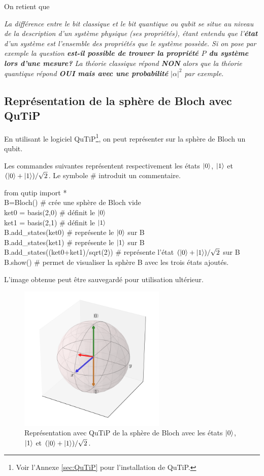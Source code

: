 On retient que

\medskip
\colorbox[gray]{0.8}{
\parbox[c]{0.9\textwidth}{
\emph{La différence entre le bit classique et le bit quantique ou qubit se situe
au niveau de la description d'un système physique (ses propriétés), étant
entendu que l'\textbf{état} d'un système est l'ensemble des propriétés que le
système possède. Si on pose par exemple la question \textbf{est-il possible de
trouver la propriété $P$ du système lors d'une mesure?} La théorie classique
répond \textbf{NON} alors que la théorie quantique répond \textbf{OUI mais avec
une probabilité} $|\alpha|^{2}$ par exemple.}
}}

\subsection{Représentation de la sphère de Bloch avec QuTiP}

En utilisant le logiciel QuTiP\footnote{Voir l'Annexe \ref{sec:QuTiP} pour 
l'installation de QuTiP.}, on peut représenter sur la sphère de Bloch un 
qubit.

Les commandes suivantes représentent respectivement les états $\vert0\rangle$, 
$\vert1\rangle$ et $(\vert0\rangle+\vert1\rangle)/\sqrt{2}$. Le symbole \# introduit un 
commentaire.

\begin{tt}
from qutip import *\\
B=Bloch() \# crée une sphère de Bloch vide\\
ket0 = basis(2,0) \# définit le $\vert0\rangle$\\
ket1 = basis(2,1) \# définit le $\vert1\rangle$\\
B.add\_states(ket0) \# représente le $\vert0\rangle$ sur B\\
B.add\_states(ket1) \# représente le $\vert1\rangle$ sur B\\
B.add\_states((ket0+ket1)/sqrt(2)) \# représente l'état 
$(\vert0\rangle+\vert1\rangle)/\sqrt{2}$ sur B\\
B.show() \# permet de visualiser la sphère B avec les trois états ajoutés.
\end{tt}
L'image obtenue peut être sauvegardé pour utilisation ultérieur.

\begin{figure}[!h]
\begin{center}
\includegraphics[height=7cm]{graphics/Bloch3.png}
\caption{Représentation avec QuTiP de la sphère de Bloch avec les états 
$\vert0\rangle$, $\vert1\rangle$ et $(\vert0\rangle+\vert1\rangle)/\sqrt{2}$.}
\end{center}
\end{figure}

